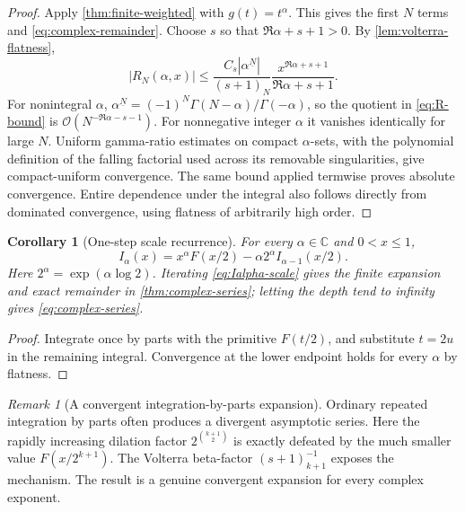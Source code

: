 \documentclass[11pt,oneside]{article}
\numberwithin{equation}{section}
\newtheorem{corollary}[theorem]{Corollary}
\theoremstyle{definition}
\theoremstyle{remark}
\newtheorem{remark}[theorem]{Remark}
\newcommand{\C}{\mathbb C}
\newcommand{\bigO}{\mathcal O}
\newcommand{\fall}[2]{#1^{\underline{#2}}}
\newcommand{\abs}[1]{\left|#1\right|}
\begin{document}
\begin{proof}
Apply \cref{thm:finite-weighted} with $g(t)=t^\alpha$.  This gives the first
$N$ terms and \eqref{eq:complex-remainder}.  Choose $s$ so that
$\Re\alpha+s+1>0$.  By \cref{lem:volterra-flatness},
\begin{equation}
 \abs{R_N(\alpha,x)}
 \le \frac{C_s\abs{\fall{\alpha}{N}}}{(s+1)_N}
 \frac{x^{\Re\alpha+s+1}}{\Re\alpha+s+1}.                \label{eq:R-bound}
\end{equation}
For nonintegral $\alpha$,
$\fall{\alpha}{N}=(-1)^N\Gamma(N-\alpha)/\Gamma(-\alpha)$, so the quotient
in \eqref{eq:R-bound} is $\bigO(N^{-\Re\alpha-s-1})$.  For nonnegative integer
$\alpha$ it vanishes identically for large $N$.  Uniform gamma-ratio estimates
on compact $\alpha$-sets, with the polynomial definition of the falling
factorial used across its removable singularities, give compact-uniform
convergence.  The same bound applied termwise proves absolute convergence.
Entire dependence under the integral also follows directly from dominated
convergence, using flatness of arbitrarily high order.
\end{proof}

\begin{corollary}[One-step scale recurrence]
\label{cor:Ialpha-scale}
For every $\alpha\in\C$ and $0<x\le1$,
\begin{equation}
 \boxed{
 I_\alpha(x)=x^\alpha F(x/2)-\alpha2^\alpha
 I_{\alpha-1}(x/2).}                                      \label{eq:Ialpha-scale}
\end{equation}
Here $2^\alpha=\exp(\alpha\log2)$.  Iterating
\eqref{eq:Ialpha-scale} gives the finite expansion and exact remainder in
\cref{thm:complex-series}; letting the depth tend to infinity gives
\eqref{eq:complex-series}.
\end{corollary}

\begin{proof}
Integrate once by parts with the primitive $F(t/2)$, and substitute $t=2u$ in
the remaining integral.  Convergence at the lower endpoint holds for every
$\alpha$ by flatness.
\end{proof}

\begin{remark}[A convergent integration-by-parts expansion]
Ordinary repeated integration by parts often produces a divergent asymptotic
series.  Here the rapidly increasing dilation factor
$2^{\binom{k+1}{2}}$ is exactly defeated by the much smaller value
$F(x/2^{k+1})$.  The Volterra beta-factor $(s+1)_{k+1}^{-1}$ exposes the
mechanism.  The result is a genuine convergent expansion for every complex
exponent.
\end{remark}
\end{document}
